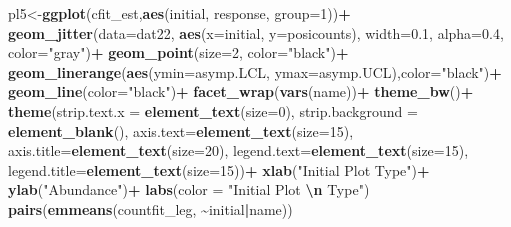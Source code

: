 \documentclass[
]{article}
\newenvironment{Shaded}{\begin{snugshade}}{\end{snugshade}}
\newcommand{\AttributeTok}[1]{\textcolor[rgb]{0.13,0.29,0.53}{#1}}
\newcommand{\DecValTok}[1]{\textcolor[rgb]{0.00,0.00,0.81}{#1}}
\newcommand{\FloatTok}[1]{\textcolor[rgb]{0.00,0.00,0.81}{#1}}
\newcommand{\FunctionTok}[1]{\textcolor[rgb]{0.13,0.29,0.53}{\textbf{#1}}}
\newcommand{\NormalTok}[1]{#1}
\newcommand{\OtherTok}[1]{\textcolor[rgb]{0.56,0.35,0.01}{#1}}
\newcommand{\SpecialCharTok}[1]{\textcolor[rgb]{0.81,0.36,0.00}{\textbf{#1}}}
\newcommand{\StringTok}[1]{\textcolor[rgb]{0.31,0.60,0.02}{#1}}
\begin{document}
\begin{Shaded}
\begin{Highlighting}[]
\NormalTok{pl5}\OtherTok{\textless{}{-}}\FunctionTok{ggplot}\NormalTok{(cfit\_est,}\FunctionTok{aes}\NormalTok{(initial, response, }\AttributeTok{group=}\DecValTok{1}\NormalTok{))}\SpecialCharTok{+}
  \FunctionTok{geom\_jitter}\NormalTok{(}\AttributeTok{data=}\NormalTok{dat22,}
              \FunctionTok{aes}\NormalTok{(}\AttributeTok{x=}\NormalTok{initial, }\AttributeTok{y=}\NormalTok{posicounts),}
              \AttributeTok{width=}\FloatTok{0.1}\NormalTok{,}
              \AttributeTok{alpha=}\FloatTok{0.4}\NormalTok{,}
              \AttributeTok{color=}\StringTok{"gray"}\NormalTok{)}\SpecialCharTok{+}
  \FunctionTok{geom\_point}\NormalTok{(}\AttributeTok{size=}\DecValTok{2}\NormalTok{, }\AttributeTok{color=}\StringTok{"black"}\NormalTok{)}\SpecialCharTok{+}
  \FunctionTok{geom\_linerange}\NormalTok{(}\FunctionTok{aes}\NormalTok{(}\AttributeTok{ymin=}\NormalTok{asymp.LCL, }\AttributeTok{ymax=}\NormalTok{asymp.UCL),}\AttributeTok{color=}\StringTok{"black"}\NormalTok{)}\SpecialCharTok{+}
  \FunctionTok{geom\_line}\NormalTok{(}\AttributeTok{color=}\StringTok{"black"}\NormalTok{)}\SpecialCharTok{+}
  \FunctionTok{facet\_wrap}\NormalTok{(}\FunctionTok{vars}\NormalTok{(name))}\SpecialCharTok{+}
  \FunctionTok{theme\_bw}\NormalTok{()}\SpecialCharTok{+}
  \FunctionTok{theme}\NormalTok{(}\AttributeTok{strip.text.x =} \FunctionTok{element\_text}\NormalTok{(}\AttributeTok{size=}\DecValTok{0}\NormalTok{),}
        \AttributeTok{strip.background =} \FunctionTok{element\_blank}\NormalTok{(),}
        \AttributeTok{axis.text=}\FunctionTok{element\_text}\NormalTok{(}\AttributeTok{size=}\DecValTok{15}\NormalTok{),}
        \AttributeTok{axis.title=}\FunctionTok{element\_text}\NormalTok{(}\AttributeTok{size=}\DecValTok{20}\NormalTok{),}
        \AttributeTok{legend.text=}\FunctionTok{element\_text}\NormalTok{(}\AttributeTok{size=}\DecValTok{15}\NormalTok{),}
        \AttributeTok{legend.title=}\FunctionTok{element\_text}\NormalTok{(}\AttributeTok{size=}\DecValTok{15}\NormalTok{))}\SpecialCharTok{+}
  \FunctionTok{xlab}\NormalTok{(}\StringTok{"Initial Plot Type"}\NormalTok{)}\SpecialCharTok{+}
  \FunctionTok{ylab}\NormalTok{(}\StringTok{"Abundance"}\NormalTok{)}\SpecialCharTok{+}
  \FunctionTok{labs}\NormalTok{(}\AttributeTok{color =} \StringTok{"Initial Plot }\SpecialCharTok{\textbackslash{}n}\StringTok{ Type"}\NormalTok{)}
\FunctionTok{pairs}\NormalTok{(}\FunctionTok{emmeans}\NormalTok{(countfit\_leg, }\SpecialCharTok{\textasciitilde{}}\NormalTok{initial}\SpecialCharTok{|}\NormalTok{name))}
\end{Highlighting}
\end{Shaded}
\end{document}
